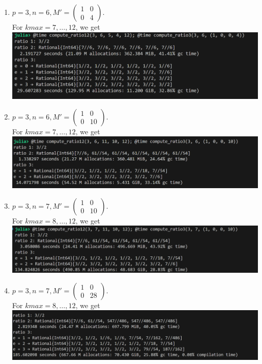 \documentclass[letterpaper,12pt]{article}
\begin{document}
\begin{enumerate}
\item $p=3, n=6, M' = \begin{pmatrix}
1 & 0 \\ 0 & 4
\end{pmatrix}.$ \\
For $kmax = 7, \dots, 12$, we get \\
\includegraphics[scale=0.4]{ex9.png} \\

\item $p=3, n=6, M' = \begin{pmatrix}
1 & 0 \\ 0 & 10
\end{pmatrix}.$ \\
For $kmax = 7, \dots, 12$, we get \\
\includegraphics[scale=0.4]{ex10.png} \\

\item $p=3, n=7, M' = \begin{pmatrix}
1 & 0 \\ 0 & 10
\end{pmatrix}.$ \\
For $kmax = 8, \dots, 12$, we get \\
\includegraphics[scale=0.4]{ex11.png} \\

\item $p=3, n=7, M' = \begin{pmatrix}
1 & 0 \\ 0 & 28
\end{pmatrix}.$ \\
For $kmax = 8, \dots, 12$, we get \\
\includegraphics[scale=0.4]{ex12.png} \\


\end{enumerate}
\end{document}
